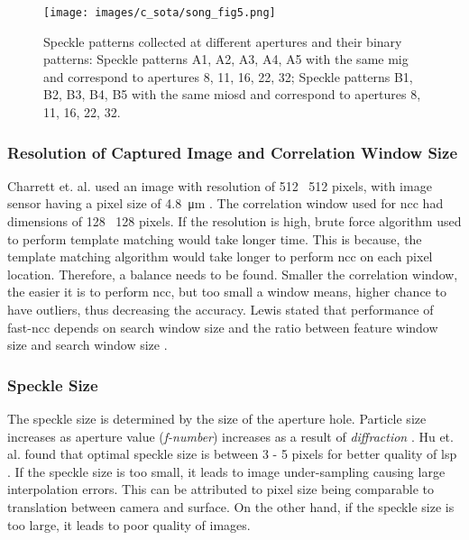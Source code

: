     \begin{figure}[h]
        \centering
        \texttt{[image: images/c\_sota/song\_fig5.png]}
        \caption{Speckle patterns collected at different apertures and their binary patterns: Speckle patterns A1, A2, A3, A4, A5 with the same \gls{mig} and correspond to apertures 8, 11, 16, 22, 32; Speckle patterns B1, B2, B3, B4, B5 with the same \gls{miosd} and correspond to apertures 8, 11, 16, 22, 32. \cite{song}}
        \label{fig:song_fig5}
    \end{figure}

    \clearpage
    
    \subsubsection*{Resolution of Captured Image and Correlation Window Size}
    Charrett et. al. used an image with resolution of 512 \times \ 512 pixels, with image sensor having a pixel size of \SI{4.8}{\micro\meter} \cite{charrett_2018}. The correlation window used for \gls{ncc} had dimensions of 128 \times \ 128 pixels. If the resolution is high, brute force algorithm used to perform template matching would take longer time. This is because, the template matching algorithm would take longer to perform \gls{ncc} on each pixel location. Therefore, a balance needs to be found. Smaller the correlation window, the easier it is to perform \Gls{ncc}, but too small a window means, higher chance to have outliers, thus decreasing the accuracy. Lewis stated that performance of fast-\Gls{ncc} depends on search window size and the ratio between feature window size and search window size \cite{lewis}.

    \subsubsection*{Speckle Size}\label{Subsubsection:Speckle_Size}
    The speckle size is determined by the size of the aperture hole. Particle size increases as aperture value (\emph{f-number}) increases as a result of \emph{diffraction} \cite{song}. Hu et. al. found that optimal speckle size is between 3 - 5 pixels for better quality of \Gls{lsp} \cite{hu}. If the speckle size is too small, it leads to image under-sampling causing large interpolation errors. This can be attributed to pixel size being comparable to translation between camera and surface. On the other hand, if the speckle size is too large, it leads to poor quality of images.
    
